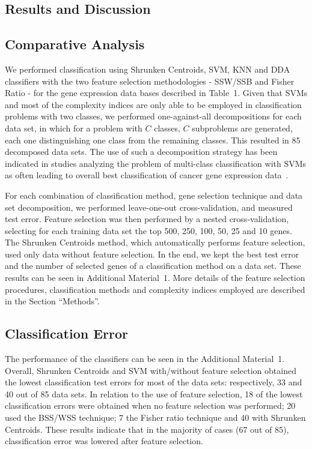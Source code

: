 \documentclass[10pt]{bmc_article}
\newenvironment{bmcformat}{\begin{raggedright}\baselineskip20pt\sloppy\setboolean{publ}{false}}{\end{raggedright}\baselineskip20pt\sloppy}
\begin{document}
\begin{bmcformat}
\section*{Results and Discussion}

\subsection*{Comparative Analysis}

We performed classification using Shrunken Centroids, SVM, KNN and DDA
classifiers with the two feature selection methodologies - SSW/SSB and
Fisher Ratio - for the gene expression data bases described in
Table~1. Given that SVMs and most of the complexity indices are only
able to be employed in classification problems with two classes, we
performed one-against-all decompositions for each data set, in which
for a problem with $C$ classes, $C$ subproblems are generated, each
one distinguishing one class from the remaining classes. This resulted
in 85 decomposed data sets. The use of such a decomposition strategy
has been indicated in studies analyzing the problem of multi-class
classification with SVMs as often leading to overall best classification of
cancer gene expression data~\cite{Statnikov2005}.

For each combination of classification method, gene selection
technique and data set decomposition, we performed leave-one-out
cross-validation, and measured test error. Feature selection was then
performed by a nested cross-validation, selecting for each training
data set the top 500, 250, 100, 50, 25 and 10 genes. The Shrunken
Centroids method, which automatically performs feature selection, used
only data without feature selection. In the end, we kept the best test
error and the number of selected genes of a classification method on a
data set. These results can be seen in Additional Material~1. More
details of the feature selection procedures, classification methods
and complexity indices employed are described in the Section
``Methods''.

\subsection*{Classification Error}

The performance of the classifiers can be seen in the Additional
Material~1. Overall, Shrunken Centroids and SVM with/without feature
selection obtained the lowest classification test errors for most of
the data sets: respectively, 33 and 40 out of 85 data sets. In relation
to the use of feature selection, 18 of the lowest classification
errors were obtained when no feature selection was performed; 20 used
the BSS/WSS technique; 7 the Fisher ratio technique and 40 with
Shrunken Centroids. These results indicate that in the majority of
cases (67 out of 85), classification error was lowered after feature
selection.


\end{bmcformat}
\end{document}
